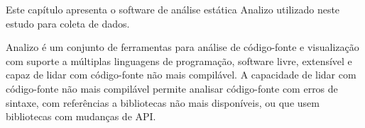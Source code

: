 {Este capítulo apresenta o software de análise estática Analizo utilizado
neste estudo para coleta de dados.}
\label{analizo}

Analizo \cite{terceiro2010analizo} é um conjunto de ferramentas para análise de código-fonte e
visualização com suporte a múltiplas linguagens de programação, software livre,
extensível e capaz de lidar com código-fonte não mais compilável. A capacidade
de lidar com código-fonte não mais compilável permite analisar código-fonte
com erros de sintaxe, com referências a bibliotecas não mais disponíveis, ou
que usem bibliotecas com mudanças de API.


